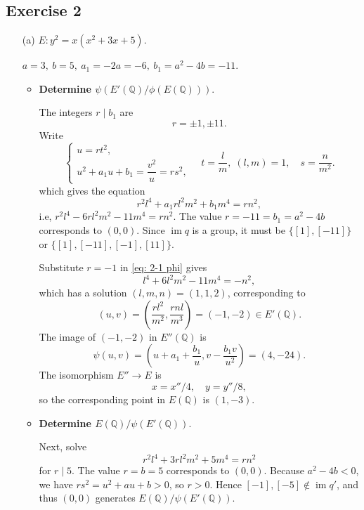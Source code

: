\documentclass{article}
\theoremstyle{definition}
\theoremstyle{remark}
\newcommand{\Q}{\mathbb{Q}}
\DeclareMathOperator{\im}{im} %
\begin{document}
\subsection*{Exercise 2}
\begin{enumerate}
\item [(a)] $E : y^2 = x(x^2 + 3x + 5)$.\par
$a = 3,\ b = 5,\ a_1 = -2a = -6,\ b_1 = a^2-4b = -11$.
\begin{itemize}
\item \textbf{Determine $\psi(E'(\Q)/\phi(E(\Q)))$}.\par
The integers $r\mid b_1$ are \[r = \pm 1, \pm 11.\]
Write \[\begin{cases}
    u = rt^2,\\  u^2 + a_1u + b_1 = \dfrac{v^2}{u} = rs^2,
\end{cases}\quad t = \frac{l}{m},\; (l, m) = 1,\quad s = \frac{n }{m^2}. \]
which gives the equation\begin{equation}\label{eq: 2-1 phi}
    r^2l^4 + a_1rl^2m^2 + b_1m^4 = rn^2,
\end{equation}
i.e, $r^2l^4 -6rl^2m^2 -11m^4 = rn^2$.
The value $r = -11 = b_1 = a^2 - 4b$ corresponds to $(0, 0)$.
Since $\im q$ is a group, it must be $\{[1], [-11]\}$ or $\{[1], [-11], [-1], [11]\}$.

Substitute $r = -1$ in \cref{eq: 2-1 phi} gives
\begin{equation}\label{eq: 2-1 phi r=-1}
    l^4 + 6l^2m^2 - 11m^4 = -n^2,
\end{equation}
which has a solution $(l, m, n) = (1, 1, 2)$,
corresponding to \[(u, v) = \left( \frac{rl^2}{m^2}, \frac{rnl}{m^3} \right) = (-1, -2)\in E'(\Q).\]
The image of $(-1, -2)$ in $E''(\Q)$ is
\[\psi(u, v) = \left( u + a_1 + \frac{b_1}{u}, v - \frac{b_1v}{u^2} \right) = (4, -24).\]
The isomorphism $E''\to E$ is \[x = x''/4,\quad y = y''/8,\]
so the corresponding point in $E(\Q)$ is $(1, -3)$.

\item \textbf{Determine $E(\Q)/\psi(E'(\Q))$}.\par
Next, solve \begin{equation}\label{eq: 2-1 psi}
    r^2l^4 + 3rl^2m^2 + 5m^4 = rn^2
\end{equation}
for $r\mid 5$.
The value $r = b = 5$ corresponds to $(0, 0)$.
Because $a^2 - 4b < 0$, we have $rs^2 = u^2 + au + b > 0$, so $r > 0$. Hence $[-1], [-5]\notin \im q'$,
and thus $(0, 0)$ generates $E(\Q)/\psi(E'(\Q))$.

\end{itemize}


\end{enumerate}
\end{document}
